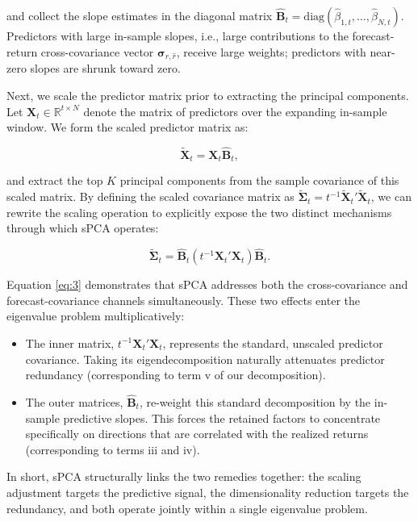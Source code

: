 \documentclass[a4paper,11pt]{article}
\begin{document}
\noindent and collect the slope estimates in the diagonal matrix $\hat{\mathbf{B}}_t = \mathrm{diag}(\hat{\beta}_{1,t}, \ldots, \hat{\beta}_{N,t})$. Predictors with large in-sample slopes, i.e., large contributions to the forecast-return cross-covariance vector $\boldsymbol{\sigma}_{r,\hat{r}}$, receive large weights; predictors with near-zero slopes are shrunk toward zero.

Next, we scale the predictor matrix prior to extracting the principal components. Let $\mathbf{X}_t \in \mathbb{R}^{t \times N}$ denote the matrix of predictors over the expanding in-sample window. We form the scaled predictor matrix as:

\begin{equation}
\tilde{\mathbf{X}}_t = \mathbf{X}_t \hat{\mathbf{B}}_t, \label{eq:2}
\end{equation}

and extract the top $K$ principal components from the sample covariance of this scaled matrix. By defining the scaled covariance matrix as $\tilde{\mathbf{\Sigma}}_t = t^{-1} \tilde{\mathbf{X}}_t' \tilde{\mathbf{X}}_t$, we can rewrite the scaling operation to explicitly expose the two distinct mechanisms through which sPCA operates:

\begin{equation}
\tilde{\mathbf{\Sigma}}_t = \hat{\mathbf{B}}_t \left( t^{-1} \mathbf{X}_t' \mathbf{X}_t \right) \hat{\mathbf{B}}_t. \label{eq:3}
\end{equation}

Equation \eqref{eq:3} demonstrates that sPCA addresses both the cross-covariance and forecast-covariance channels simultaneously. These two effects enter the eigenvalue problem multiplicatively:
\begin{itemize}
    \item The inner matrix, $t^{-1} \mathbf{X}_t' \mathbf{X}_t$, represents the standard, unscaled predictor covariance. Taking its eigendecomposition naturally attenuates predictor redundancy (corresponding to term v of our decomposition).
    \item The outer matrices, $\hat{\mathbf{B}}_t$, re-weight this standard decomposition by the in-sample predictive slopes. This forces the retained factors to concentrate specifically on directions that are correlated with the realized returns (corresponding to terms iii and iv).
\end{itemize}

In short, sPCA structurally links the two remedies together: the scaling adjustment targets the predictive signal, the dimensionality reduction targets the redundancy, and both operate jointly within a single eigenvalue problem.
\end{document}
